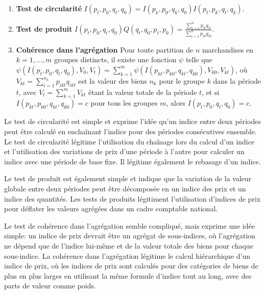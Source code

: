 \documentclass[]{article}
\begin{document}
\begin{enumerate}
\def\labelenumi{\arabic{enumi}.}
\item
  \textbf{Test de circularité} \(I(p_{t}, p_{0}, q_{t}, q_{0}) = I(p_{k}, p_{0}, q_{k}, q_{0}) I(p_{t}, p_{k}, q_{t}, q_{k})\).
\item
  \textbf{Test de produit} \(I(p_{t}, p_{0}, q_{t}, q_{0}) Q (q_{t}, q_{0}, p_{t}, p_{0}) = \frac{\sum_{i = 1}^{n} p_{it} q_{it}} {\sum_{i = 1}^{n} p_{i0} q_{i0}}\).
\item
  \textbf{Cohérence dans l'agrégation} Pour toute partition de \(n\) marchandises en \(k = 1, \ldots, m\) groupes distincts, il existe une fonction \(\psi\) telle que \(\psi (I(p_{t }, p_{0}, q_{t}, q_{0}), V_{0}, V_{t}) = \sum_{k = 1}^{m} \psi (I(p_{kt}, p_{k0}, q_{kt}, q_{k0}), V_{k0}, V_{kt})\), où \(V_{kt} = \sum_{i = 1}^{n_{k}} p_{ikt} q_{ikt}\) est la valeur des biens \(n_{k}\) pour le groupe \(k\) dans la période \(t\), avec \(V_{t} = \sum_{k = 1}^{m} V_{kt}\) étant la valeur totale de la période \(t\), et si \(I(p_{kt}, p_{k0}, q_{kt}, q_{k0}) = c\) pour tous les groupes \(m\), alors \(I(p_{t}, p_{0}, q_{t}, q_{0}) = c\).
\end{enumerate}

Le test de circularité est simple et exprime l'idée qu'un indice entre deux périodes peut être calculé en enchaînant l'indice pour des périodes consécutives ensemble. Le test de circularité légitime l'utilisation du chaînage lors du calcul d'un indice et l'utilisation des variations de prix d'une période à l'autre pour calculer un indice avec une période de base fixe. Il légitime également le rebasage d'un indice.

Le test de produit est également simple et indique que la variation de la valeur globale entre deux périodes peut être décomposée en un indice des prix et un indice des quantités. Les tests de produits légitiment l'utilisation d'indices de prix pour déflater les valeurs agrégées dans un cadre comptable national.

Le test de cohérence dans l'agrégation semble compliqué, mais exprime une idée simple: un indice de prix devrait être un agrégat de sous-indices, où l'agrégation ne dépend que de l'indice lui-même et de la valeur totale des biens pour chaque sous-indice. La cohérence dans l'agrégation légitime le calcul hiérarchique d'un indice de prix, où les indices de prix sont calculés pour des catégories de biens de plus en plus larges en utilisant la même formule d'indice tout au long, avec des parts de valeur comme poids.
\end{document}
